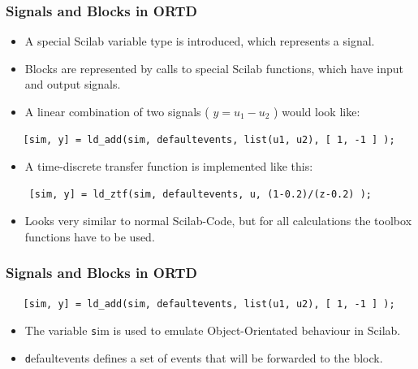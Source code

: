 \documentclass[serif,9pt,xcolor=dvipsnames]{beamer}
\begin{document}
\begin{frame}[fragile]
  \frametitle{Signals and Blocks in ORTD}

\begin{itemize}
 \item A special Scilab variable type is introduced, which represents a signal.
 \item Blocks are represented by calls to special Scilab functions, which have input and output signals.
\end{itemize}

\begin{itemize}
 \item A linear combination of two signals ( $y=u_1 - u_2$ ) would look like:
\end{itemize}


{\small 
\begin{lstlisting}
   [sim, y] = ld_add(sim, defaultevents, list(u1, u2), [ 1, -1 ] );
\end{lstlisting}}
  

\begin{itemize}
 \item A time-discrete transfer function is implemented like this:
\end{itemize}

{\small 
\begin{lstlisting} 
    [sim, y] = ld_ztf(sim, defaultevents, u, (1-0.2)/(z-0.2) );
\end{lstlisting}}


\begin{itemize}
 \item Looks very similar to normal Scilab-Code, but for all calculations the toolbox functions have to be used.
\end{itemize}
 


\end{frame}



\begin{frame}[fragile]
\frametitle{Signals and Blocks in ORTD}
 
 
{\small 
\begin{lstlisting}
   [sim, y] = ld_add(sim, defaultevents, list(u1, u2), [ 1, -1 ] );
\end{lstlisting}}
 
 \begin{itemize}
  \item The variable {\texttt sim} is used to emulate Object-Orientated behaviour in Scilab.
\item {\texttt defaultevents} defines a set of events that will be forwarded to the block.
 \end{itemize}

 
\end{frame}
\end{document}
